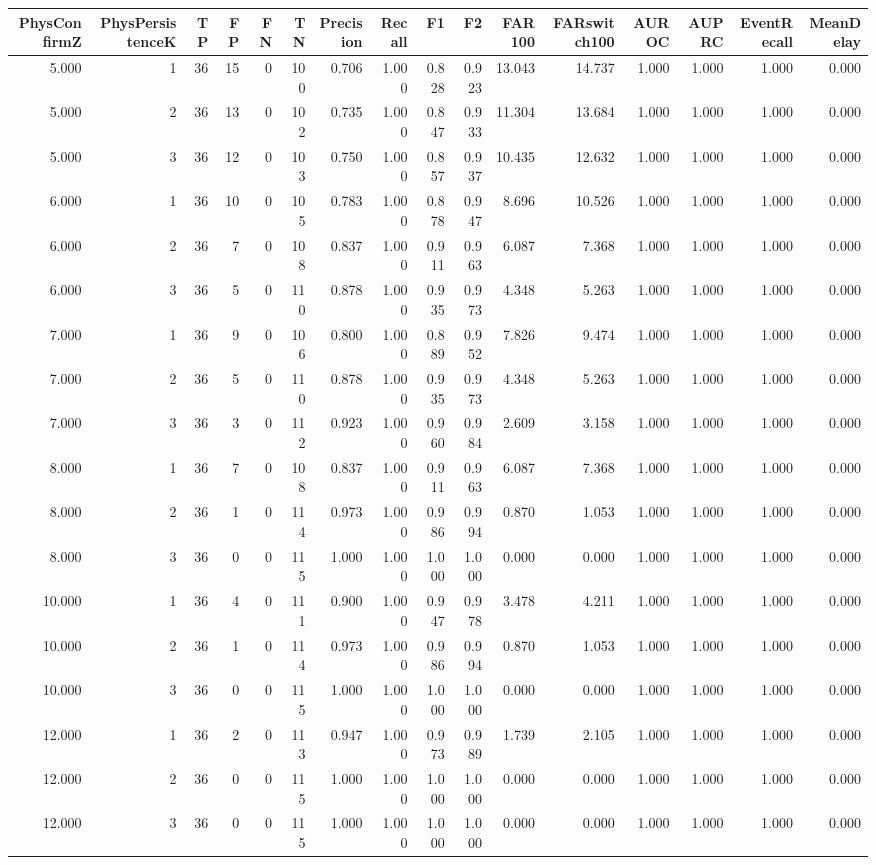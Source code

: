 \begin{tabular}{rrrrrrrrrrrrrrrr}
\toprule
PhysConfirmZ & PhysPersistenceK & TP & FP & FN & TN & Precision & Recall & F1 & F2 & FAR100 & FARswitch100 & AUROC & AUPRC & EventRecall & MeanDelay \\
\midrule
5.000 & 1 & 36 & 15 & 0 & 100 & 0.706 & 1.000 & 0.828 & 0.923 & 13.043 & 14.737 & 1.000 & 1.000 & 1.000 & 0.000 \\
5.000 & 2 & 36 & 13 & 0 & 102 & 0.735 & 1.000 & 0.847 & 0.933 & 11.304 & 13.684 & 1.000 & 1.000 & 1.000 & 0.000 \\
5.000 & 3 & 36 & 12 & 0 & 103 & 0.750 & 1.000 & 0.857 & 0.937 & 10.435 & 12.632 & 1.000 & 1.000 & 1.000 & 0.000 \\
6.000 & 1 & 36 & 10 & 0 & 105 & 0.783 & 1.000 & 0.878 & 0.947 & 8.696 & 10.526 & 1.000 & 1.000 & 1.000 & 0.000 \\
6.000 & 2 & 36 & 7 & 0 & 108 & 0.837 & 1.000 & 0.911 & 0.963 & 6.087 & 7.368 & 1.000 & 1.000 & 1.000 & 0.000 \\
6.000 & 3 & 36 & 5 & 0 & 110 & 0.878 & 1.000 & 0.935 & 0.973 & 4.348 & 5.263 & 1.000 & 1.000 & 1.000 & 0.000 \\
7.000 & 1 & 36 & 9 & 0 & 106 & 0.800 & 1.000 & 0.889 & 0.952 & 7.826 & 9.474 & 1.000 & 1.000 & 1.000 & 0.000 \\
7.000 & 2 & 36 & 5 & 0 & 110 & 0.878 & 1.000 & 0.935 & 0.973 & 4.348 & 5.263 & 1.000 & 1.000 & 1.000 & 0.000 \\
7.000 & 3 & 36 & 3 & 0 & 112 & 0.923 & 1.000 & 0.960 & 0.984 & 2.609 & 3.158 & 1.000 & 1.000 & 1.000 & 0.000 \\
8.000 & 1 & 36 & 7 & 0 & 108 & 0.837 & 1.000 & 0.911 & 0.963 & 6.087 & 7.368 & 1.000 & 1.000 & 1.000 & 0.000 \\
8.000 & 2 & 36 & 1 & 0 & 114 & 0.973 & 1.000 & 0.986 & 0.994 & 0.870 & 1.053 & 1.000 & 1.000 & 1.000 & 0.000 \\
8.000 & 3 & 36 & 0 & 0 & 115 & 1.000 & 1.000 & 1.000 & 1.000 & 0.000 & 0.000 & 1.000 & 1.000 & 1.000 & 0.000 \\
10.000 & 1 & 36 & 4 & 0 & 111 & 0.900 & 1.000 & 0.947 & 0.978 & 3.478 & 4.211 & 1.000 & 1.000 & 1.000 & 0.000 \\
10.000 & 2 & 36 & 1 & 0 & 114 & 0.973 & 1.000 & 0.986 & 0.994 & 0.870 & 1.053 & 1.000 & 1.000 & 1.000 & 0.000 \\
10.000 & 3 & 36 & 0 & 0 & 115 & 1.000 & 1.000 & 1.000 & 1.000 & 0.000 & 0.000 & 1.000 & 1.000 & 1.000 & 0.000 \\
12.000 & 1 & 36 & 2 & 0 & 113 & 0.947 & 1.000 & 0.973 & 0.989 & 1.739 & 2.105 & 1.000 & 1.000 & 1.000 & 0.000 \\
12.000 & 2 & 36 & 0 & 0 & 115 & 1.000 & 1.000 & 1.000 & 1.000 & 0.000 & 0.000 & 1.000 & 1.000 & 1.000 & 0.000 \\
12.000 & 3 & 36 & 0 & 0 & 115 & 1.000 & 1.000 & 1.000 & 1.000 & 0.000 & 0.000 & 1.000 & 1.000 & 1.000 & 0.000 \\
\bottomrule
\end{tabular}
